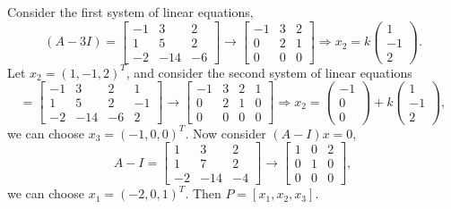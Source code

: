 \begin{solution}
  Consider the first system of linear equations,
  \begin{equation}
    (A - 3I) =
    \begin{bmatrix}
      -1 & 3 & 2\\
      1 & 5 & 2\\
      -2 & -14 & -6
    \end{bmatrix}
    \rightarrow
    \begin{bmatrix}
     - 1 & 3 & 2\\
      0 & 2 & 1\\
      0 & 0 & 0
    \end{bmatrix}
    \Rightarrow
    x_2 = k
    \begin{pmatrix}
      1\\
      -1\\
      2
    \end{pmatrix}.
  \end{equation}
  Let $x_2 = (1, -1, 2)^T$, and consider the second system of linear equations
  \begin{equation}
    [A - 3I|x_2] = 
    \begin{bmatrix}
      -1 & 3 & 2 & 1\\
      1 & 5 & 2 & -1\\
      -2 & -14 & -6 & 2
    \end{bmatrix}
    \rightarrow
    \begin{bmatrix}
      -1 & 3 & 2 & 1\\
      0 & 2 & 1 & 0\\
      0 & 0 & 0 & 0
    \end{bmatrix}
    \Rightarrow
    x_2 =
    \begin{pmatrix}
      -1\\0\\0
    \end{pmatrix}
    + k
    \begin{pmatrix}
      1\\-1\\2
    \end{pmatrix},
  \end{equation}
  we can choose $x_3 = (-1, 0, 0)^T$.
  Now consider $(A - I) x = 0$,
  \begin{equation}
    A - I =
    \begin{bmatrix}
      1 & 3 & 2\\
      1 & 7 & 2\\
      -2 & -14 & -4
    \end{bmatrix}
    \rightarrow
    \begin{bmatrix}
      1 & 0 & 2\\
      0 & 1 & 0\\
      0 & 0 & 0
    \end{bmatrix},
  \end{equation}
  we can choose $x_1 = (-2, 0, 1)^T$.
  Then $P = [x_1, x_2, x_3]$.
\end{solution}

